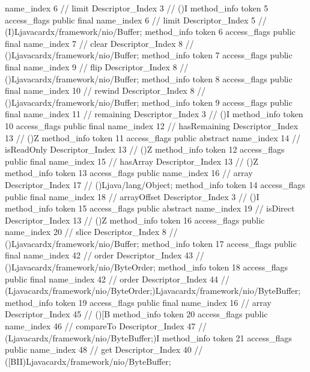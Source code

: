 {{{{{					name_index	6		// limit
					Descriptor_Index	3		// ()I
				}
				method_info {
					token	5
					access_flags	public final
					name_index	6		// limit
					Descriptor_Index	5		// (I)Ljavacardx/framework/nio/Buffer;
				}
				method_info {
					token	6
					access_flags	public final
					name_index	7		// clear
					Descriptor_Index	8		// ()Ljavacardx/framework/nio/Buffer;
				}
				method_info {
					token	7
					access_flags	public final
					name_index	9		// flip
					Descriptor_Index	8		// ()Ljavacardx/framework/nio/Buffer;
				}
				method_info {
					token	8
					access_flags	public final
					name_index	10		// rewind
					Descriptor_Index	8		// ()Ljavacardx/framework/nio/Buffer;
				}
				method_info {
					token	9
					access_flags	public final
					name_index	11		// remaining
					Descriptor_Index	3		// ()I
				}
				method_info {
					token	10
					access_flags	public final
					name_index	12		// hasRemaining
					Descriptor_Index	13		// ()Z
				}
				method_info {
					token	11
					access_flags	public abstract
					name_index	14		// isReadOnly
					Descriptor_Index	13		// ()Z
				}
				method_info {
					token	12
					access_flags	public final
					name_index	15		// hasArray
					Descriptor_Index	13		// ()Z
				}
				method_info {
					token	13
					access_flags	public
					name_index	16		// array
					Descriptor_Index	17		// ()Ljava/lang/Object;
				}
				method_info {
					token	14
					access_flags	public final
					name_index	18		// arrayOffset
					Descriptor_Index	3		// ()I
				}
				method_info {
					token	15
					access_flags	public abstract
					name_index	19		// isDirect
					Descriptor_Index	13		// ()Z
				}
				method_info {
					token	16
					access_flags	public
					name_index	20		// slice
					Descriptor_Index	8		// ()Ljavacardx/framework/nio/Buffer;
				}
				method_info {
					token	17
					access_flags	public final
					name_index	42		// order
					Descriptor_Index	43		// ()Ljavacardx/framework/nio/ByteOrder;
				}
				method_info {
					token	18
					access_flags	public final
					name_index	42		// order
					Descriptor_Index	44		// (Ljavacardx/framework/nio/ByteOrder;)Ljavacardx/framework/nio/ByteBuffer;
				}
				method_info {
					token	19
					access_flags	public final
					name_index	16		// array
					Descriptor_Index	45		// ()[B
				}
				method_info {
					token	20
					access_flags	public
					name_index	46		// compareTo
					Descriptor_Index	47		// (Ljavacardx/framework/nio/ByteBuffer;)I
				}
				method_info {
					token	21
					access_flags	public
					name_index	48		// get
					Descriptor_Index	40		// ([BII)Ljavacardx/framework/nio/ByteBuffer;
}}}}}
